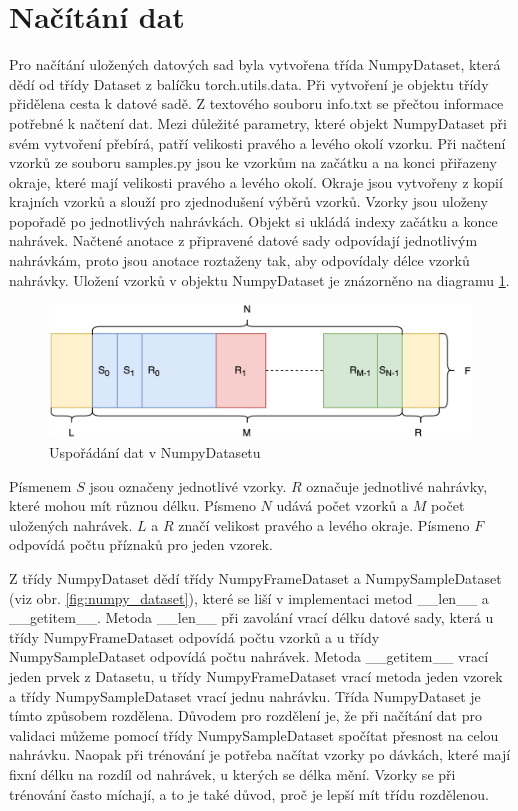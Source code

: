 \documentclass[FM,BP]{tulthesis}
\newcommand{\note}[1]{\todo[color=blue!40]{#1}}
\begin{document}
\section{Načítání dat} %
Pro načítání uložených datových sad byla vytvořena třída NumpyDataset, která dědí od třídy Dataset z balíčku torch.utils.data. Při vytvoření je objektu třídy přidělena cesta k datové sadě. Z textového souboru info.txt se přečtou informace potřebné k načtení dat. Mezi důležité parametry, které objekt NumpyDataset při svém vytvoření přebírá, patří velikosti pravého a levého okolí vzorku. Při načtení vzorků ze souboru samples.py jsou ke vzorkům na začátku a na konci přiřazeny okraje, které mají velikosti pravého a levého okolí. Okraje jsou vytvořeny z kopií krajních vzorků a slouží pro zjednodušení výběrů vzorků. Vzorky jsou uloženy popořadě po jednotlivých nahrávkách. Objekt si ukládá indexy začátku a konce nahrávek. Načtené anotace z připravené datové sady odpovídají jednotlivým nahrávkám, proto jsou anotace roztaženy tak, aby odpovídaly délce vzorků nahrávky. Uložení vzorků v objektu NumpyDataset je znázorněno na diagramu \mbox{\ref{fig:data_arrangement}}.

\begin{figure}[htbp]
\centerline{\includegraphics[scale=.125]{dataset_arrangement.png}}
\caption{Uspořádání dat v NumpyDatasetu}
\label{fig:data_arrangement}
\end{figure}
\FloatBarrier

Písmenem $ S $ jsou označeny jednotlivé vzorky. $ R $ označuje jednotlivé nahrávky, které mohou mít různou délku. Písmeno $ N $ udává počet vzorků a $ M $ počet uložených nahrávek. $ L $ a $ R $ značí velikost pravého a levého okraje. Písmeno $ F $ odpovídá počtu příznaků pro jeden vzorek.

Z třídy NumpyDataset dědí třídy NumpyFrameDataset a NumpySampleDataset (viz obr. \mbox{\ref{fig:numpy_dataset}}), které se liší v implementaci metod \_\_len\_\_ a \_\_getitem\_\_. Metoda \_\_len\_\_ při zavolání vrací délku datové sady, která u třídy NumpyFrameDataset odpovídá počtu vzorků a u třídy NumpySampleDataset odpovídá počtu nahrávek. Metoda \_\_getitem\_\_ vrací jeden prvek z Datasetu, u třídy NumpyFrameDataset vrací metoda jeden vzorek a třídy NumpySampleDataset vrací jednu nahrávku. \note{to pojmenování není úplně ideální, často sample = frame}
Třída NumpyDataset je tímto způsobem rozdělena. Důvodem pro rozdělení je, že při načítání dat pro validaci můžeme pomocí třídy NumpySampleDataset spočítat přesnost na celou nahrávku. Naopak při trénování je potřeba načítat vzorky po dávkách, které mají fixní délku na rozdíl od nahrávek, u kterých se délka mění. Vzorky se při trénování často míchají, a to je také důvod, proč je lepší mít třídu rozdělenou.
\end{document}
